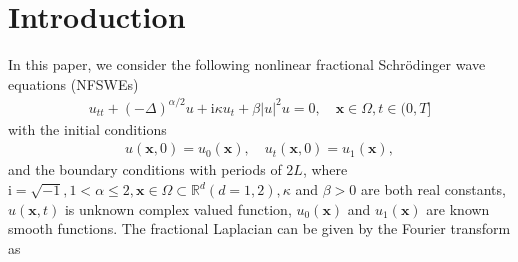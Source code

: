 \documentclass[preprint,compress,3p,10pt,fleqn]{elsarticle}
\numberwithin{equation}{section}
\begin{document}


\section{Introduction}\label{Section 1}

In this paper, we consider the following nonlinear fractional Schr{\"o}dinger wave equations (NFSWEs)
\begin{align}\label{eq_1}
u_{t t}+(-\Delta)^{\alpha / 2} u+\mathrm{i} \kappa u_{t}+\beta|u|^{2} u=0, \quad \boldsymbol{x} \in \Omega, t \in(0, T]
\end{align}
with the initial conditions
\begin{align}\label{eq_3}
u(\boldsymbol{x}, 0)=u_{0}(\boldsymbol{x}), \quad u_{t}(\boldsymbol{x}, 0)=u_{1}(\boldsymbol{x}),
\end{align}
and the boundary conditions with periods of $2L$,
where $\mathrm{i}=\sqrt{-1}, 1<\alpha \leq 2, \boldsymbol{x}\in \Omega \subset \mathbb{R}^d ( d=1,2), \kappa$ and $\beta>0$ are both real constants, $u(\boldsymbol{x}, t)$ is unknown complex valued function, $u_{0}(\boldsymbol{x})$ and $u_{1}(\boldsymbol{x})$ are known smooth functions. %
The fractional Laplacian can be given by the Fourier transform as
\end{document}
